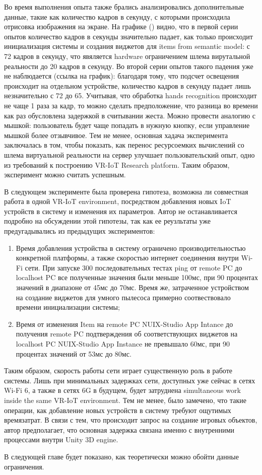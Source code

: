 Во время выполнения опыта также брались анализировались дополнительные данные, такие как количество кадров в секунду, с которыми происходила отрисовка изображения на экране. На графике () видно, что в первой серии опытов количество кадров в секунды значительно падает, как только происходит инициализация системы и создания виджетов для items from semantic model: с 72 кадров в секунду, что явяляется hardware ограничением шлема вирутальной реальности до 20 кадров в секунду. Во второй серии опытов такого падения уже не наблюдается (ссылка на график): благодаря тому, что подсчет освещения происходит на отдельном устройстве, количество кадров в секунду падает лишь незначительно с 72 до 65. Учитывая, что обработка hands recognition происходит не чаще 1 раза за кадр, то можно сделать предположение, что разница во времени как раз обусловлена задержкой в считывании жеста. Можно провести аналогию с мышкой: пользователь будет чаще попадать в нужную кнопку, если управление мышкой более отзывчивое. Тем не менее, основная хадача эксперимента заключалась в том, чтобы показать, как перенос ресурсоемких вычислений со шлема виртуальной реальности на сервер улучшает пользовательский опыт, одно из требований к построению VR-IoT Research platform. Таким образом, эксперимент можно считать успешным.


В следующем эксперименте была проверена гипотеза, возможна ли совместная работа в одной VR-IoT environment, посредством добавления новых IoT устройств в систему и изменения их параметров. Автор не останавливается подробно на обсуждении этой гипотезы, так как ее реузльтаты уже предугадывались из предыдущих экспериментов:
\begin{enumerate}
    \item Время добавления устройства в систему ограничено производительностью конкретной платформы, а также скоростью интернет соединения внутри Wi-Fi сети. При запуске 300 последовательных тестах ping от remote PC до localhost PC все полученные значения были меньше 100мс, при 90 процентах значений в диапазоне от 45мс до 70мс. Время же, затраченное устройством на создание виджетов для умного пылесоса примерно соотвествовало времени инициализации системы;
    \item Время от изменения Item на remote PC NUIX-Studio App Intance до получения remote PC подтверждения об соответствующих виджетов на localhost PC NUIX-Studio App Instance не превышало 60мс, при 90 процентах значений от 53мс до 80мс.
\end{enumerate}

Таким образом, скорость работы сети играет существенную роль в работе системы. Лишь при минимальных задержках сети, доступных уже сейчас в сетях Wi-Fi 6, а также в сетях 6G в будущем, будет затруднена simultaneous work inside the same VR-IoT environment. Тем не менее, было замечено, что такие операции, как добавление новых устройств в систему требуют ощутимых времязатрат. В связи с тем, что происходит запрос на создание игровых объектов, автор предполагает, что основная задержка связана именно с внутренними процессами внутри Unity 3D engine.

В следующей главе будет показано, как теоретически можно обойти данные ограничения.